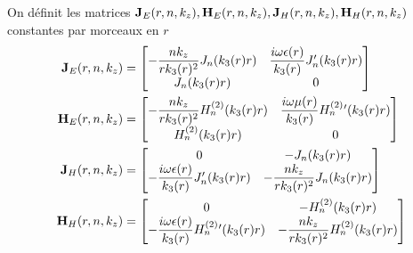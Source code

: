   \begin{defn}
    \label{def:cylindre:JE-JH-HE-HH}
    On définit les matrices \(\mathbf{J}_{E}(r,n,k_z),\mathbf{H}_{E}(r,n,k_z),\mathbf{J}_{H}(r,n,k_z),\mathbf{H}_{H}(r,n,k_z)\) constantes par morceaux en \(r\)
    \begin{align*}
      \mathbf{J}_{E}(r,n,k_z) &=
      \begin{bmatrix}
        -\dfrac{nk_z}{rk_3(r)^2}J_n(k_3(r)r) & \dfrac{i\omega\epsilon(r)}{k_3(r)}J_n'(k_3(r)r)
        \\
        J_n(k_3(r)r) & 0
      \end{bmatrix}
      \\
      \mathbf{H}_{E}(r,n,k_z) &=
      \begin{bmatrix}
        -\dfrac{nk_z}{rk_3(r)^2}H_n^{(2)}(k_3(r)r) & \dfrac{i\omega\mu(r)}{k_3(r)}H_n^{(2)}{}'(k_3(r)r)
        \\
        H_n^{(2)}(k_3(r)r) & 0
      \end{bmatrix}
      \\
      \mathbf{J}_{H}(r,n,k_z) &=
      \begin{bmatrix}
        0 & -J_n(k_3(r)r)
        \\
        -\dfrac{i\omega\epsilon(r)}{k_3(r)}J_n'(k_3(r)r) & -\dfrac{nk_z}{rk_3(r)^2}J_n(k_3(r)r)
      \end{bmatrix}
      \\
      \mathbf{H}_{H}(r,n,k_z) &=
      \begin{bmatrix}
        0 & -H_n^{(2)}(k_3(r)r)
        \\
        -\dfrac{i\omega\epsilon(r)}{k_3(r)}H_n^{(2)}{}'(k_3(r)r) & -\dfrac{nk_z}{rk_3(r)^2}H_n^{(2)}(k_3(r)r)
      \end{bmatrix}
    \end{align*}
  \end{defn}

